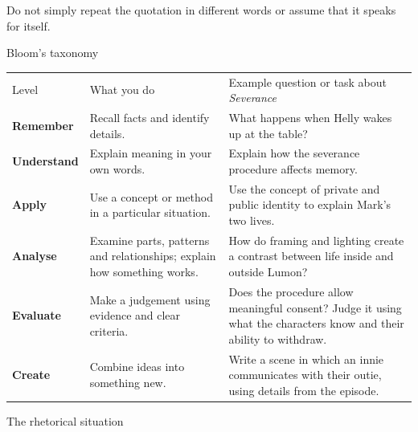 \documentclass[11pt,a4paper,oneside]{book}
\begin{document}
Do not simply repeat the quotation in different words or assume that it speaks for itself.


\clearpage{}\label{note-blooms-taxonomy}
{\displayfont\color{navy}\fontsize{30}{34}\selectfont Bloom's taxonomy\par}\vspace{4mm}

{\small\setlength{\tabcolsep}{4pt}\renewcommand{\arraystretch}{1.3}\begin{tabularx}{\linewidth}{@{}>{\raggedright\arraybackslash}X>{\raggedright\arraybackslash}X>{\raggedright\arraybackslash}X@{}}\toprule
Level & What you do & Example question or task about \emph{Severance}\\
\textbf{Remember} & Recall facts and identify details. & What happens when Helly wakes up at the table?\\
\textbf{Understand} & Explain meaning in your own words. & Explain how the severance procedure affects memory.\\
\textbf{Apply} & Use a concept or method in a particular situation. & Use the concept of private and public identity to explain Mark's two lives.\\
\textbf{Analyse} & Examine parts, patterns and relationships; explain how something works. & How do framing and lighting create a contrast between life inside and outside Lumon?\\
\textbf{Evaluate} & Make a judgement using evidence and clear criteria. & Does the procedure allow meaningful consent? Judge it using what the characters know and their ability to withdraw.\\
\textbf{Create} & Combine ideas into something new. & Write a scene in which an innie communicates with their outie, using details from the episode.\\
\bottomrule\end{tabularx}}\par\medskip

\clearpage{}\label{note-rhetorical-situation}
{\displayfont\color{navy}\fontsize{30}{34}\selectfont The rhetorical situation\par}\vspace{4mm}
\end{document}
